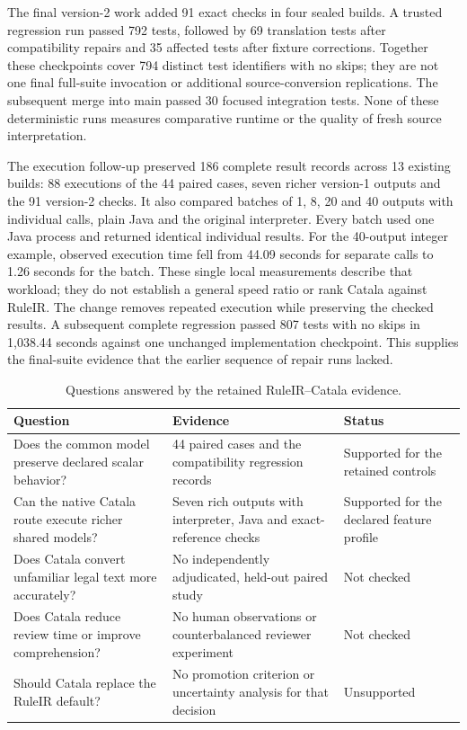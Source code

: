 \documentclass[12pt,a4paper,oneside,openany]{book}
\begin{document}
The final version-2 work added 91 exact checks in four sealed builds. A trusted
regression run passed 792 tests, followed by 69 translation tests after
compatibility repairs and 35 affected tests after fixture corrections. Together
these checkpoints cover 794 distinct test identifiers with no skips; they are
not one final full-suite invocation or additional source-conversion
replications. The subsequent merge into main passed 30 focused integration
tests. None of these deterministic runs measures comparative runtime or the
quality of fresh source interpretation.

The execution follow-up preserved 186 complete result records across 13 existing
builds: 88 executions of the 44 paired cases, seven richer version-1 outputs and
the 91 version-2 checks. It also compared batches of 1, 8, 20 and 40 outputs with
individual calls, plain Java and the original interpreter. Every batch used one
Java process and returned identical individual results. For the 40-output
integer example, observed execution time fell from 44.09 seconds for separate
calls to 1.26 seconds for the batch. These single local measurements describe
that workload; they do not establish a general speed ratio or rank Catala against
RuleIR. The change removes repeated execution while preserving the checked
results. A subsequent complete regression passed 807 tests with no skips in
1,038.44 seconds against one unchanged implementation checkpoint. This supplies
the final-suite evidence that the earlier sequence of repair runs lacked.

\begin{table}[H]
\centering
\caption{Questions answered by the retained RuleIR--Catala evidence.}
\label{tab:evaluation-catala-boundaries}
\begin{tabularx}{\textwidth}{P{45mm}YY}
\toprule
Question & Evidence & Status\\
\midrule
Does the common model preserve declared scalar behavior? & 44 paired cases and the compatibility regression records & Supported for the retained controls\\
\addlinespace[0.4em]
Can the native Catala route execute richer shared models? & Seven rich outputs with interpreter, Java and exact-reference checks & Supported for the declared feature profile\\
\addlinespace[0.4em]
Does Catala convert unfamiliar legal text more accurately? & No independently adjudicated, held-out paired study & Not checked\\
\addlinespace[0.4em]
Does Catala reduce review time or improve comprehension? & No human observations or counterbalanced reviewer experiment & Not checked\\
\addlinespace[0.4em]
Should Catala replace the RuleIR default? & No promotion criterion or uncertainty analysis for that decision & Unsupported\\
\bottomrule
\end{tabularx}
\end{table}
\end{document}
